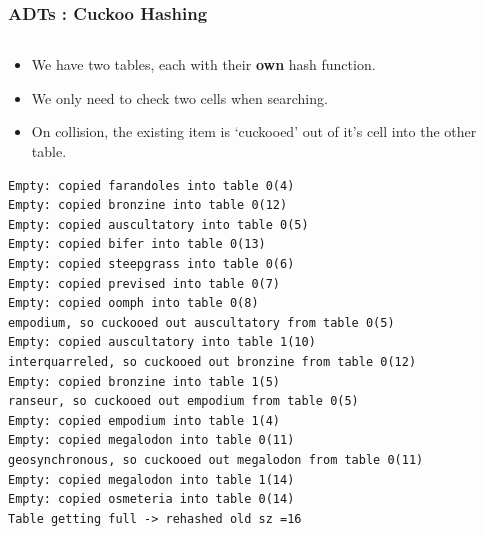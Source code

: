 \begin{frame}[fragile]
\frametitle{ADTs : Cuckoo Hashing}
\begin{columns}[T]

\begin{column}{0.45\textwidth}
\begin{itemize}
\item We have two tables, each with their {\bf own} hash function.
\item We only need to check two cells when searching.
\item On collision, the existing item is `cuckooed' out of it's cell into the other table.
\end{itemize}
{\tiny
\begin{verbatim}
Empty: copied farandoles into table 0(4)
Empty: copied bronzine into table 0(12)
Empty: copied auscultatory into table 0(5)
Empty: copied bifer into table 0(13)
Empty: copied steepgrass into table 0(6)
Empty: copied prevised into table 0(7)
Empty: copied oomph into table 0(8)
empodium, so cuckooed out auscultatory from table 0(5)
Empty: copied auscultatory into table 1(10)
interquarreled, so cuckooed out bronzine from table 0(12)
Empty: copied bronzine into table 1(5)
ranseur, so cuckooed out empodium from table 0(5)
Empty: copied empodium into table 1(4)
Empty: copied megalodon into table 0(11)
geosynchronous, so cuckooed out megalodon from table 0(11)
Empty: copied megalodon into table 1(14)
Empty: copied osmeteria into table 0(14)
Table getting full -> rehashed old sz =16
\end{verbatim}
}
\end{column}


\end{columns}
\end{frame}
